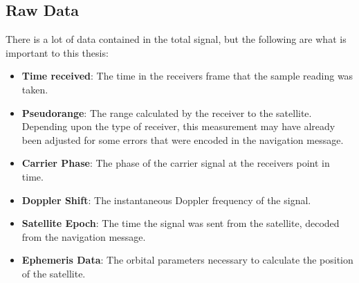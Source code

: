 \subsection{Raw Data}
There is a lot of data contained in the total signal, but the following are what is important to this thesis:
\begin{itemize}
	\item \textbf{Time received}: The time in the receivers frame that the sample reading was taken.
	\item \textbf{Pseudorange}: The range calculated by the receiver to the satellite. Depending upon the type of receiver, this measurement may have already been adjusted for some errors that were encoded in the navigation message.
	\item \textbf{Carrier Phase}: The phase of the carrier signal at the receivers point in time.
	\item \textbf{Doppler Shift}: The instantaneous Doppler frequency of the signal. 
	\item \textbf{Satellite Epoch}: The time the signal was sent from the satellite, decoded from the navigation message.
	\item \textbf{Ephemeris Data}: The orbital parameters necessary to calculate the position of the satellite.
\end{itemize}



